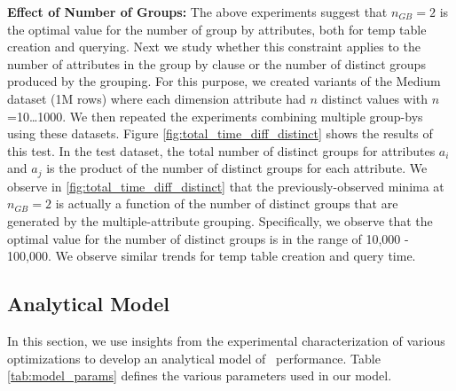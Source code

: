 {\bf Effect of Number of Groups:} The above experiments suggest that $n_{GB}=2$
is the optimal value for the number of group by attributes, both for temp table
creation and querying.
Next we study whether this constraint applies to the number of attributes in the
group by clause or the number of distinct groups produced by the grouping. For
this purpose, we created variants of the Medium dataset (1M rows) where each
dimension attribute had $n$ distinct values with $n$=10\ldots1000. We then
repeated the experiments combining multiple group-bys using these datasets.
Figure \ref{fig:total_time_diff_distinct} shows the results of this test. In the
test dataset, the total number of distinct groups for attributes $a_i$ and $a_j$
is the product of the number of distinct groups for each attribute. We observe
in \ref{fig:total_time_diff_distinct} that the previously-observed minima at
$n_{GB}=2$ is actually a function of the number of distinct groups that are
generated by the multiple-attribute grouping.
Specifically, we observe that the optimal value for the number of distinct
groups is in the range of 10,000 - 100,000. We observe similar trends for temp
table creation and query time.



\subsection{Analytical Model}
\label{sec:model}
In this section, we use insights from the experimental characterization of
various optimizations to develop an analytical model of \SeeDB\ performance.
Table \ref{tab:model_params} defines the various parameters used in our model.

